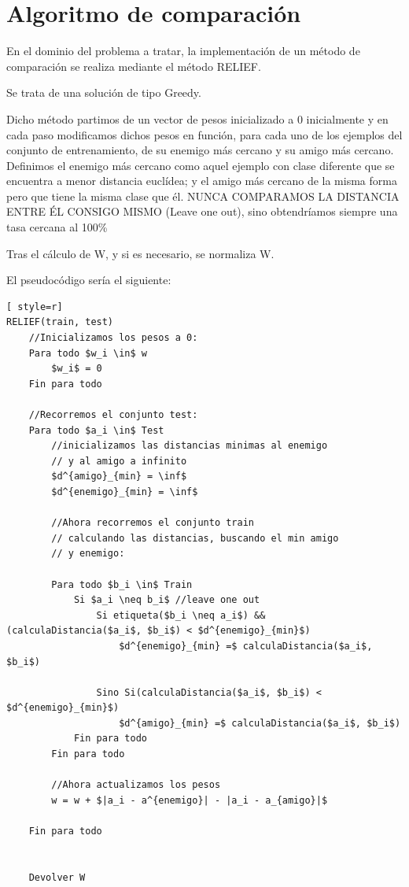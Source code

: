 \section{Algoritmo de comparación}
En el dominio del problema a tratar, la implementación de un método de comparación se realiza mediante el método RELIEF.

Se trata de una solución de tipo Greedy.

Dicho método partimos de un vector de pesos inicializado a 0 inicialmente y en cada paso modificamos dichos pesos en función, para cada uno de los ejemplos del conjunto de entrenamiento, de su enemigo más cercano y su amigo más cercano.\\ 

Definimos el enemigo más cercano como aquel ejemplo con clase diferente que se encuentra a menor distancia euclídea; y el amigo más cercano de la misma forma pero que tiene la misma clase que él.
NUNCA COMPARAMOS LA DISTANCIA ENTRE ÉL CONSIGO MISMO (Leave one out), sino obtendríamos siempre una tasa cercana al 100\%

Tras el cálculo de W, y si es necesario, se normaliza W.

El pseudocódigo sería el siguiente:

\begin{lstlisting}[ style=r]
RELIEF(train, test)
	//Inicializamos los pesos a 0:
	Para todo $w_i \in$ w
		$w_i$ = 0
	Fin para todo
	
	//Recorremos el conjunto test:
	Para todo $a_i \in$ Test
		//inicializamos las distancias minimas al enemigo
		// y al amigo a infinito
		$d^{amigo}_{min} = \inf$
		$d^{enemigo}_{min} = \inf$
		
		//Ahora recorremos el conjunto train
		// calculando las distancias, buscando el min amigo
		// y enemigo:
		
		Para todo $b_i \in$ Train
			Si $a_i \neq b_i$ //leave one out
				Si etiqueta($b_i \neq a_i$) && (calculaDistancia($a_i$, $b_i$) < $d^{enemigo}_{min}$)
					$d^{enemigo}_{min} =$ calculaDistancia($a_i$, $b_i$)
					
				Sino Si(calculaDistancia($a_i$, $b_i$) < $d^{enemigo}_{min}$)
					$d^{amigo}_{min} =$ calculaDistancia($a_i$, $b_i$)
			Fin para todo
		Fin para todo
		
		//Ahora actualizamos los pesos
		w = w + $|a_i - a^{enemigo}| - |a_i - a_{amigo}|$
		
	Fin para todo
	
	
	Devolver W
\end{lstlisting}


